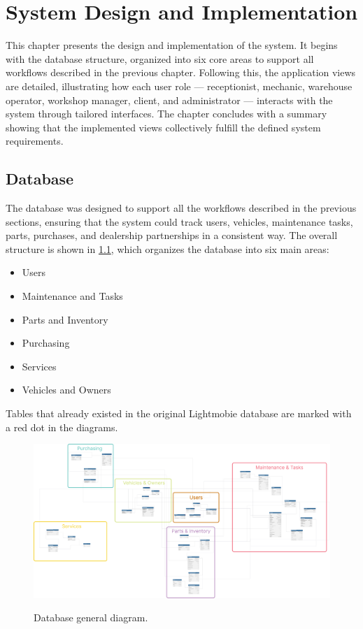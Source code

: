 \chapter{System Design and Implementation}%
\label{chapter:systemDesignandImplementation}

\begin{introduction}
This chapter presents the design and implementation of the system. It begins with the database structure, organized into six core areas to support all workflows described in the previous chapter. Following this, the application views are detailed, illustrating how each user role — receptionist, mechanic, warehouse operator, workshop manager, client, and administrator — interacts with the system through tailored interfaces. The chapter concludes with a summary showing that the implemented views collectively fulfill the defined system requirements.
\end{introduction} 


\section{Database} 


The database was designed to support all the workflows described in the previous sections, ensuring that the system could track users, vehicles, maintenance tasks, parts, purchases, and dealership partnerships in a consistent way. The overall structure is shown in \ref{fig:dbGeneral}, which organizes the database into six main areas:
 
\begin{itemize}
  \item Users
  \item Maintenance and Tasks
  \item Parts and Inventory 
  \item Purchasing
  \item Services
  \item Vehicles and Owners
\end{itemize}

Tables that already existed in the original Lightmobie database are marked with a red dot in the diagrams.

\begin{figure}[h]
  \caption{Database general diagram.}
  \centering
  \includegraphics[width=\textwidth]{figs/dbDiagrams/DbDiagramFull}
  \label{fig:dbGeneral} 
\end{figure}



